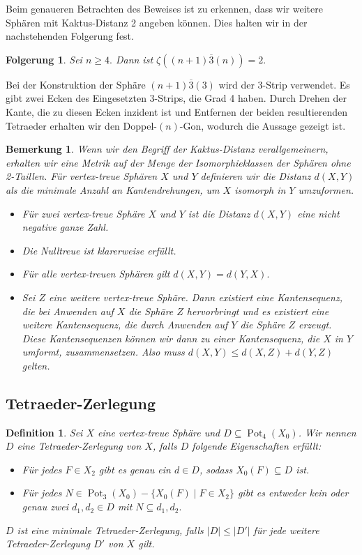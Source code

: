 \documentclass[12pt,titlepage,twoside,cleardoublepage]{article}
\theoremstyle{nummermitklammern}
\newtheorem{folgerung}[temp]{Folgerung}
\newtheorem{definition}[temp]{Definition}
\newtheorem{bemerkung}[temp]{Bemerkung}
\newtheorem{definition}[zahl]{Definition}
\newtheorem{folgerung}[zahl]{Folgerung}
\newtheorem{bemerkung}[zahl]{Bemerkung}
\numberwithin{equation}{section}
\DeclareMathOperator{\Pot}{Pot}
\begin{document}
Beim genaueren Betrachten des Beweises ist zu erkennen, dass wir weitere Sphären mit Kaktus-Distanz 2 angeben können.
Dies halten wir in der nachstehenden Folgerung fest.
\begin{folgerung}
Sei $n\geq 4.$ Dann ist $\zeta ((n+1)\overline{3}(n))=2.$
\end{folgerung}
Bei der Konstruktion der Sphäre $(n+1)\overline{3}(3)$ wird der 3-Strip verwendet. Es gibt zwei Ecken des Eingesetzten 3-Strips, die Grad 4 haben. Durch Drehen der Kante, die zu diesen Ecken inzident ist und Entfernen der beiden resultierenden Tetraeder erhalten wir den Doppel-$(n)$-Gon, wodurch die Aussage gezeigt ist.
\begin{bemerkung}
Wenn wir den Begriff der Kaktus-Distanz verallgemeinern, erhalten wir eine Metrik auf der Menge der Isomorphieklassen der Sphären ohne 2-Taillen. Für vertex-treue Sphären $X$ und $Y$ definieren wir die Distanz $d(X,Y)$ als die minimale Anzahl an Kantendrehungen, um $X$ isomorph in $Y$ umzuformen. 
\begin{itemize}
\item Für zwei vertex-treue Sphäre $X$ und $Y$ ist die Distanz $d(X,Y)$ eine nicht negative ganze Zahl.
\item Die Nulltreue ist klarerweise erfüllt.
\item Für alle vertex-treuen Sphären gilt $d(X,Y)=d(Y,X).$
\item Sei $Z$ eine weitere vertex-treue Sphäre. Dann existiert eine Kantensequenz, die bei Anwenden auf $X$ die Sphäre $Z$ hervorbringt und es existiert eine weitere Kantensequenz, die durch Anwenden auf $Y$ die Sphäre $Z$ erzeugt. Diese Kantensequenzen können wir dann zu einer Kantensequenz, die $X$ in $Y$ umformt, zusammensetzen. Also muss $d(X,Y)\leq d(X,Z)+d(Y,Z)$ gelten.
\end{itemize}
\end{bemerkung}

\subsection{Tetraeder-Zerlegung}
\begin{definition}
Sei $X$ eine vertex-treue Sphäre und $D\subseteq \Pot_4(X_0)$. Wir nennen $D$ eine Tetraeder-Zerlegung von $X$, falls $D$ folgende Eigenschaften erfüllt:
\begin{itemize}
\item Für jedes $F\in X_2$ gibt es genau ein $d\in D$, sodass $X_0(F) \subseteq D$ ist.
\item Für jedes $N\in \Pot_3(X_0)-\{X_0(F)\mid F\in X_2\}$ gibt es entweder kein oder genau zwei $d_1,d_2\in D$ mit $N\subseteq d_1,d_2.$
\end{itemize}
$D$ ist eine minimale Tetraeder-Zerlegung, falls $\vert D \vert\leq \vert D' \vert$ für jede weitere Tetraeder-Zerlegung $D'$ von $X$ gilt.
\end{definition}
\end{document}
